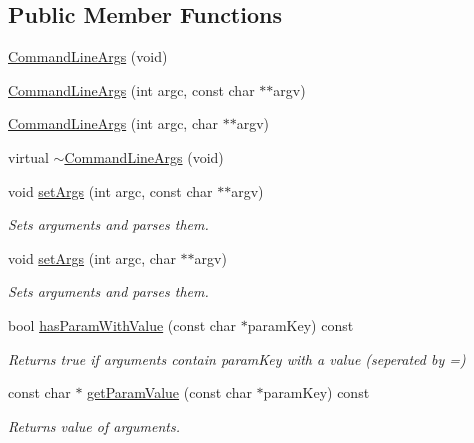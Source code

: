 \subsection*{Public Member Functions}
\begin{DoxyCompactItemize}
\item 
\hyperlink{classel_1_1base_1_1utils_1_1_command_line_args_a58a5e0acd54a1412d09ec39a1140f067}{Command\+Line\+Args} (void)
\item 
\hyperlink{classel_1_1base_1_1utils_1_1_command_line_args_a9872b14450e9cd1c1bd96227743c083b}{Command\+Line\+Args} (int argc, const char $\ast$$\ast$argv)
\item 
\hyperlink{classel_1_1base_1_1utils_1_1_command_line_args_a297b31b31829d9545d6e808f4be9195c}{Command\+Line\+Args} (int argc, char $\ast$$\ast$argv)
\item 
virtual \hyperlink{classel_1_1base_1_1utils_1_1_command_line_args_a41c4aafeffaef7ab6320feb709d6a0d6}{$\sim$\+Command\+Line\+Args} (void)
\item 
void \hyperlink{classel_1_1base_1_1utils_1_1_command_line_args_a2d59b4184e0a6a314ef1c9a4c6d946e6}{set\+Args} (int argc, const char $\ast$$\ast$argv)
\begin{DoxyCompactList}\small\item\em Sets arguments and parses them. \end{DoxyCompactList}\item 
void \hyperlink{classel_1_1base_1_1utils_1_1_command_line_args_af88a16e6ce7b5d48f9679f304367b27a}{set\+Args} (int argc, char $\ast$$\ast$argv)
\begin{DoxyCompactList}\small\item\em Sets arguments and parses them. \end{DoxyCompactList}\item 
bool \hyperlink{classel_1_1base_1_1utils_1_1_command_line_args_acc9fa8eeed2deecffb6019173de5ab48}{has\+Param\+With\+Value} (const char $\ast$param\+Key) const 
\begin{DoxyCompactList}\small\item\em Returns true if arguments contain param\+Key with a value (seperated by \textquotesingle{}=\textquotesingle{}) \end{DoxyCompactList}\item 
const char $\ast$ \hyperlink{classel_1_1base_1_1utils_1_1_command_line_args_ad1abe08dfdbdd95c72474197ba4a3cbd}{get\+Param\+Value} (const char $\ast$param\+Key) const 
\begin{DoxyCompactList}\small\item\em Returns value of arguments. \end{DoxyCompactList}\item 

\end{DoxyCompactItemize}
